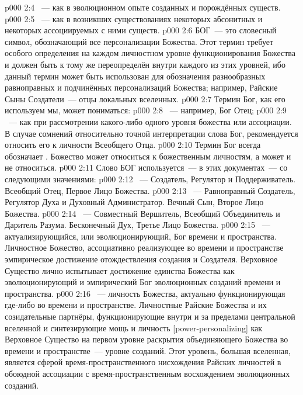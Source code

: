 \vs p000 2:4 ~--- как в эволюционном опыте созданных и порождённых существ.
\vs p000 2:5 ~--- как в возникших существованиях некоторых абсонитных и некоторых ассоциируемых с ними существ.
\vs p000 2:6 БОГ~--- это словесный символ, обозначающий все персонализации Божества. Этот термин требует особого определения на каждом личностном уровне функционирования Божества и должен быть к тому же переопределён внутри каждого из этих уровней, ибо данный термин может быть использован для обозначения разнообразных равноправных и подчинённых персонализаций Божества; например, Райские Сыны Создатели~--- отцы локальных вселенных.
\vs p000 2:7 \pc Термин Бог, как его используем мы, может пониматься:
\vs p000 2:8 ~--- например, Бог Отец;
\vs p000 2:9 ~--- как при рассмотрении какого\hyp{}либо одного уровня божества или ассоциации. В случае сомнений относительно точной интерпретации слова Бог, рекомендуется относить его к личности Всеобщего Отца.
\vs p000 2:10 \pc Термин Бог всегда обозначает . Божество может относиться к божественным личностям, а может и не относиться.
\vs p000 2:11 \pc Слово БОГ используется~--- в этих документах~--- со следующими значениями:
\vs p000 2:12 ~--- Создатель, Регулятор и Поддерживатель. Всеобщий Отец, Первое Лицо Божества.
\vs p000 2:13 ~--- Равноправный Создатель, Регулятор Духа и Духовный Администратор. Вечный Сын, Второе Лицо Божества.
\vs p000 2:14 ~--- Совместный Вершитель, Всеобщий Объединитель и Даритель Разума. Бесконечный Дух, Третье Лицо Божества.
\vs p000 2:15 ~--- актуализирующийся, или эволюционирующий, Бог времени и пространства. Личностное Божество, ассоциативно реализующее во времени и пространстве эмпирическое достижение отождествления создания и Создателя. Верховное Существо лично испытывает достижение единства Божества как эволюционирующий и эмпирический Бог эволюционных созданий времени и пространства.
\vs p000 2:16 ~--- личность Божества, актуально функционирующая где\hyp{}либо во времени и пространстве. Личностные Райские Божества и их созидательные партнёры, функционирующие внутри и за пределами центральной вселенной и синтезирующие мощь и личность [power\hyp{}personalizing] как Верховное Существо на первом уровне раскрытия объединяющего Божества во времени и пространстве~--- уровне созданий. Этот уровень, большая вселенная, является сферой время\hyp{}пространственного нисхождения Райских личностей в обоюдной ассоциации с время\hyp{}пространственным восхождением эволюционных созданий.
